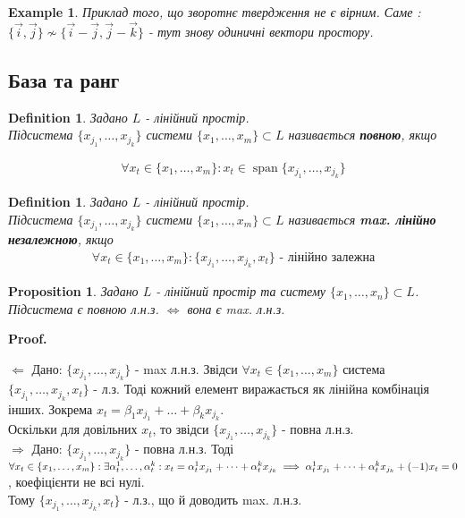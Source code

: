 \documentclass[a4paper, 10pt]{article}
\makeatletter
\def\rightproof{$\boxed{\Rightarrow}$ }
\def\leftproof{$\boxed{\Leftarrow}$ }
\theoremstyle{theoremdd}
\newtheorem{definition}[theorem]{Definition}
\newtheorem{example}[theorem]{Example}
\newtheorem{proposition}[theorem]{Proposition}
\DeclareMathOperator{\linspan}{span}
\renewenvironment{proof}[1][Proof.\\]{\par
\pushQED{\hfill \qed}%
\normalfont \topsep6\p@\@plus6\p@\relax
\trivlist
\item\relax
{\bfseries
#1\@addpunct{.}}\hspace\labelsep\ignorespaces
}{%
\popQED\endtrivlist\@endpefalse
}
\makeatother
\begin{document}
	\begin{example}
	Приклад того, що зворотнє твердження не є вірним. Саме :\\
	$\{\vec{i},\vec{j}\} \not\sim \{\vec{i}-\vec{j}, \vec{j}-\vec{k}\}$ - тут знову одиничні вектори простору.
	\end{example}
	
	\subsection{База та ранг}
	\begin{definition}
	Задано $L$ - лінійний простір.\\
	Підсистема $\{x_{j_1}, \dots, x_{j_k}\}$ системи $\{x_1, \dots, x_m\} \subset L$ називається \textbf{повною}, якщо
	\iffalse
	\begin{align*}
	\forall x_t \in \{x_1, \dots, x_m\}: \exists \alpha^1_t, \dots, \alpha^k_t: x_t = \alpha^1_t x_{j_1} + \dots + \alpha^k_t x_{j_k}
	\end{align*}
	\fi
	\begin{align*}
	\forall x_t \in \{x_1,\dots,x_m\}: x_t \in \linspan\{x_{j_1},\dots,x_{j_k}\}
	\end{align*}
	\end{definition}
	
	\begin{definition}
	Задано $L$ - лінійний простір.\\
	Підсистема $\{x_{j_1}, \dots, x_{j_k}\}$ системи $\{x_1, \dots, x_m\} \subset L$ називається \textbf{max. лінійно незалежною}, якщо
	\begin{align*}
	\forall x_t \in \{x_1, \dots, x_m\}: \{x_{j_1}, \dots, x_{j_k}, x_t\} \textrm{ - лінійно залежна}
	\end{align*}
	\end{definition}
	
	\begin{proposition}
	Задано $L$ - лінійний простір та систему $\{x_1,\dots,x_n\} \subset L$.\\
	Підсистема є повною л.н.з. $\iff$ вона є max. л.н.з.
	\end{proposition}
	
	\begin{proof}
	\leftproof Дано: $\{x_{j_1}, \dots, x_{j_k}\}$ - max л.н.з. Звідси $\forall x_t \in \{x_1, \dots, x_m \}$ система $\{x_{j_1}, \dots, x_{j_k}, x_t\}$ - л.з. Тоді кожний елемент виражається як лінійна комбінація інших. Зокрема $x_t = \beta_1 x_{j_1} + \dots + \beta_k x_{j_k}$.\\
	Оскільки для довільних $x_t$, то звідси $\{x_{j_1},\dots, x_{j_k}\}$ - повна л.н.з.
	\bigskip \\
	\rightproof Дано: $\{x_{j_1}, \dots, x_{j_k}\}$ - повна л.н.з. Тоді $\forall x_t \in \{x_1, \dots, x_m\}: \exists \alpha^1_t, \dots, \alpha^k_t: \\ x_t = \alpha^1_t x_{j_1} + \dots + \alpha^k_t x_{j_k} \implies \alpha^1_t x_{j_1} + \dots + \alpha^k_t x_{j_k} + (-1)x_t = 0$, коефіцієнти не всі нулі.\\
	Тому $\{x_{j_1}, \dots, x_{j_k}, x_t\}$ - л.з., що й доводить max. л.н.з.
	\end{proof}
	
\end{document}
